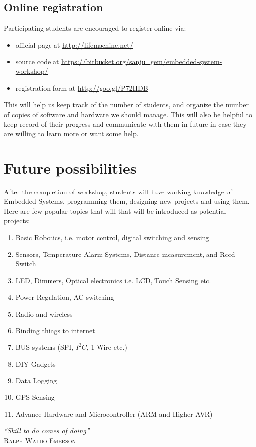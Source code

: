 \documentclass[12pt]{article} %
\begin{document}
\pagebreak

\subsection{Online registration} %
Participating students are encouraged to register online via: 
\begin{itemize}
\item official page at \url{http://lifemachine.net/}
\item source code at \url{https://bitbucket.org/sanju_gem/embedded-system-workshop/}
\item registration form at \url{http://goo.gl/P72HDB}
\end{itemize}
This will help us keep track of the number of students, and organize the number of copies of software and hardware we should manage. This will also be helpful to keep record of their progress and communicate with them in future in case they are willing to learn more or want some help.

\section{Future possibilities} %
After the completion of workshop, students will have working knowledge of Embedded Systems, programming them, designing new projects and using them. Here are few popular topics that will that will be introduced as potential projects:
\begin{enumerate}
\item Basic Robotics, i.e. motor control, digital switching and sensing
\item Sensors, Temperature Alarm Systems, Distance measurement, and Reed Switch
\item LED, Dimmers, Optical electronics i.e. LCD, Touch Sensing etc.
\item Power Regulation, AC switching
\item Radio and wireless
\item Binding things to internet  
\item BUS systems (SPI, $I^2C$, 1-Wire etc.)
\item DIY Gadgets
\item Data Logging
\item GPS Sensing
\item Advance Hardware and Microcontroller (ARM and Higher AVR)
\end{enumerate}
\vspace{0.5cm}
\emph{\large “Skill to do comes of doing”}\\
\textsc {Ralph Waldo Emerson}
\end{document}
